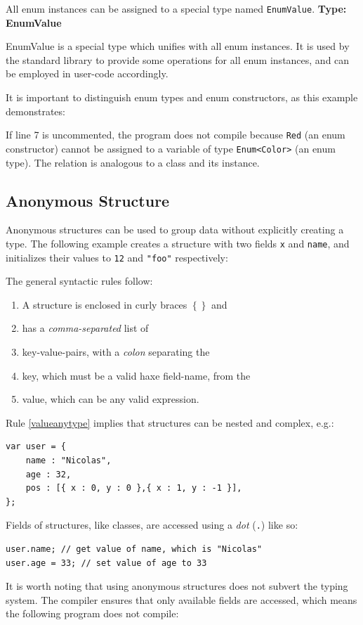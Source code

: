 \documentclass{article}
\newcommand{\type}[1]{\texttt{#1}}
\newcommand{\expr}[1]{\texttt{#1}}
\newenvironment{myshaded}
  {\def\FrameCommand{\fboxsep=\topsep\colorbox{bgcolor}}%
  \MakeFramed {\advance\hsize-\width \FrameRestore}}%
 {\endMakeFramed}
\newcommand{\define}[3][Definition]
	{\begin{myshaded}\noindent\textbf{#1: #2}\par\nobreak\noindent\ignorespaces#3\label{def:#2}\end{myshaded}}
\begin{document}
All enum instances can be assigned to a special type named \type{EnumValue}.
\define[Type]{EnumValue}{EnumValue is a special type which unifies with all enum instances. It is used by the standard library to provide some operations for all enum instances, and can be employed in user-code accordingly.}

It is important to distinguish enum types and enum constructors, as this example demonstrates:


If line 7 is uncommented, the program does not compile because \expr{Red} (an enum constructor) cannot be assigned to a variable of type \type{Enum<Color>} (an enum type). The relation is analogous to a class and its instance.



\subsection{Anonymous Structure}
\label{Anonymous Structure}

Anonymous structures can be used to group data without explicitly creating a type. The following example creates a structure with two fields \expr{x} and \expr{name}, and initializes their values to \expr{12} and \expr{"foo"} respectively:


The general syntactic rules follow:

\begin{enumerate}
	\item A structure is enclosed in curly braces \expr{$\left\{\right\}$} and
	\item has a \emph{comma-separated} list of
	\item key-value-pairs, with a \emph{colon} separating the
	\item key, which must be a valid haxe field-name, from the
	\item\label{valueanytype} value, which can be any valid expression.
\end{enumerate}
Rule \ref{valueanytype} implies that structures can be nested and complex, e.g.:

\begin{lstlisting}
var user = {
    name : "Nicolas",
    age : 32,
    pos : [{ x : 0, y : 0 },{ x : 1, y : -1 }],
};
\end{lstlisting}
Fields of structures, like classes, are accessed using a \emph{dot} (\expr{.}) like so:

\begin{lstlisting}
user.name; // get value of name, which is "Nicolas"
user.age = 33; // set value of age to 33
\end{lstlisting}
It is worth noting that using anonymous structures does not subvert the typing system. The compiler ensures that only available fields are accessed, which means the following program does not compile:
\end{document}

